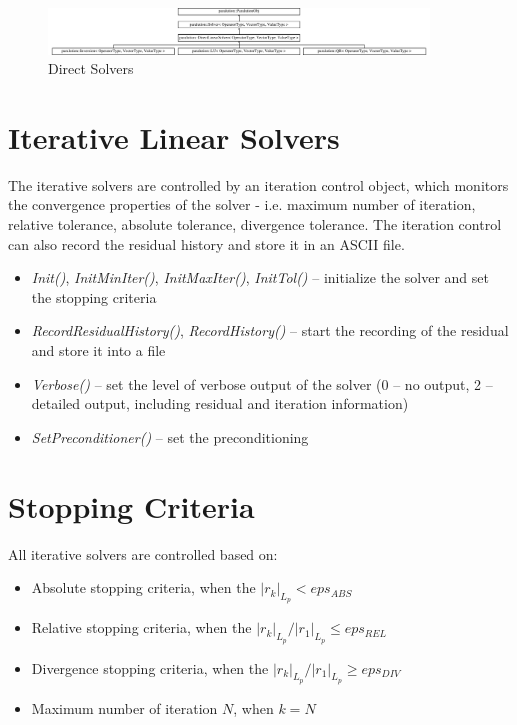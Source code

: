 \begin{figure}[!ht]
\centering
\includegraphics[width=0.9\textwidth]{./fig/body/classparalution_1_1_direct_linear_solver.pdf}
\caption{Direct Solvers}
\end{figure}


\section{Iterative Linear Solvers}

The iterative solvers are controlled by an iteration control object, which monitors the convergence properties of the solver - i.e. maximum number of iteration, relative tolerance, absolute tolerance, divergence tolerance. The iteration control can also record the residual history and store it in an ASCII file.

\begin{itemize}
\itemsep0em
\item \emph{Init()}, \emph{InitMinIter()}, \emph{InitMaxIter()}, \emph{InitTol()} -- initialize the solver and set the stopping criteria
\item \emph{RecordResidualHistory()}, \emph{RecordHistory()} -- start the recording of the residual and store it into a file
\item \emph{Verbose()} -- set the level of verbose output of the solver (0 -- no output, 2 -- detailed output, including residual and iteration information)
\item \emph{SetPreconditioner()} -- set the preconditioning
\end{itemize}

\section{Stopping Criteria}

All iterative solvers are controlled based on:
\begin{itemize}
\itemsep0em
\item Absolute stopping criteria, when the $|r_k|_{L_p} < eps_{ABS}$
\item Relative stopping criteria, when the $|r_k|_{L_p} / |r_1|_{L_p} \leq eps_{REL}$ 
\item Divergence stopping criteria, when the $|r_k|_{L_p} / |r_1|_{L_p} \geq eps_{DIV}$
\item Maximum number of iteration $N$, when $k = N$ 
\end{itemize}

